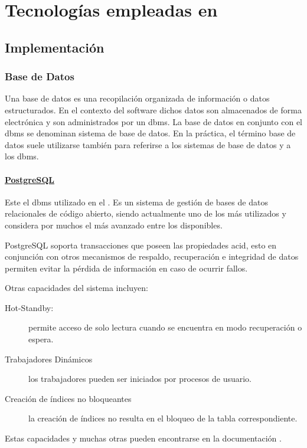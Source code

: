 \section{Tecnologías empleadas en \SIOSU}\label{sec:tecnologias}


\subsection{Implementación}

\subsubsection{Base de Datos}
Una base de datos es una recopilación organizada de información o datos
estructurados. En el contexto del software dichos datos son almacenados de forma electrónica y son administrados por un \acrfull{dbms}. La base de datos en conjunto con el \acrshort{dbms} se denominan sistema de base de datos. En la práctica, el término base de datos suele utilizarse también para referirse a los sistemas de base de datos y a los \acrshort{dbms}.

\paragraph{\href{https://www.postgresql.org/}{PostgreSQL}}
Este el \acrshort{dbms} utilizado en el \SIOSU. Es un sistema de gestión de bases de datos relacionales de código abierto, siendo actualmente uno de los más utilizados y considera por muchos el más avanzado entre los disponibles.

PostgreSQL soporta transacciones que poseen las propiedades \acrfull{acid}, esto en conjunción con otros mecanismos de respaldo, recuperación e integridad de datos permiten evitar la pérdida de información en caso de ocurrir fallos.

Otras capacidades del sistema incluyen:
\begin{description}
    \item[Hot-Standby:] permite acceso de solo lectura cuando se encuentra en modo recuperación o espera.
    \item[Trabajadores Dinámicos] los trabajadores pueden ser iniciados por procesos de usuario.
    \item[Creación de índices no bloqueantes] la creación de índices no resulta en el bloqueo de la tabla correspondiente.
\end{description}
Estas capacidades y muchas otras pueden encontrarse en la documentación \cite{postgreFeatures}.

